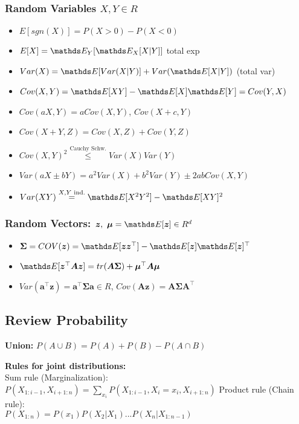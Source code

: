 \subsubsection{Random Variables $X,Y \in R$} \label{random vars}
\begin{itemize}
    \item $E[sgn(X)] = P(X>0)-P(X<0)$
    \item $E[X] = \E[Y]{\E[X]{X|Y}}$ total exp
    \item $Var(X) = \E {Var(X|Y)} + Var(\E {X|Y})$ (total var)
    \item $Cov(X,Y) = \E {XY} - \E {X}\E {Y} = Cov(Y,X)$
    \item $Cov(aX,Y) = aCov(X,Y)$, $Cov(X +c,Y)$
    \item $Cov(X+Y, Z) = Cov(X,Z) + Cov(Y,Z)$
    \item $Cov(X,Y)^{2} \overset{\text{Cauchy Schw.}}{\leq} Var(X)Var(Y)$
    \item $Var(aX \pm bY) = a^{2}Var(X)+b^{2}Var(Y) \pm 2abCov(X,Y)$
    \item $Var(XY) \overset{X,Y \text{ ind.}}{=} \E {X^{2}Y^{2}} - \E {XY}^{2}$
\end{itemize}
\subsubsection{Random Vectors: $\bm{z},\ \bm{\mu}= \E {\bm{z}} \in R^{d}$}
\begin{itemize}
    \item $\bm{\Sigma} = COV(\bm{z}) = \E {\bm{z}\bm{z}^{\top}} - \E {\bm{z}} \E {\bm{z}}^{\top}$
    \item $\E {\bm{z}^{\top}\bm{A}\bm{z}} = tr(\bm{A}\bm{\Sigma}) + \bm{\mu}^{\top}\bm{A}\bm{\mu}$
    \item $Var(\bm{a}^{\top}\bm{z}) = \bm{a}^{\top}\bm{\Sigma}\bm{a} \in R$, $Cov(\bm{A}\bm{z}) = \bm{A}\bm{\Sigma}\bm{A}^{\top}$
\end{itemize}


\subsection{Review Probability}

\textbf{Union:} $P(A\cup B)=P(A)+P(B)-P(A\cap B)$

\textbf{Rules for joint distributions:}\\
Sum rule (Marginalization):\\
    $P(X_{1:i-1}, X_{i+1:n})=\sum_{x_i}P(X_{1:i-1}, X_i=x_i, X_{i+1:n})$
Product rule (Chain rule):\\
    $P(X_{1:n})=P(x_1)P(X_2|X_1)...P(X_n|X_{1:n-1})$

